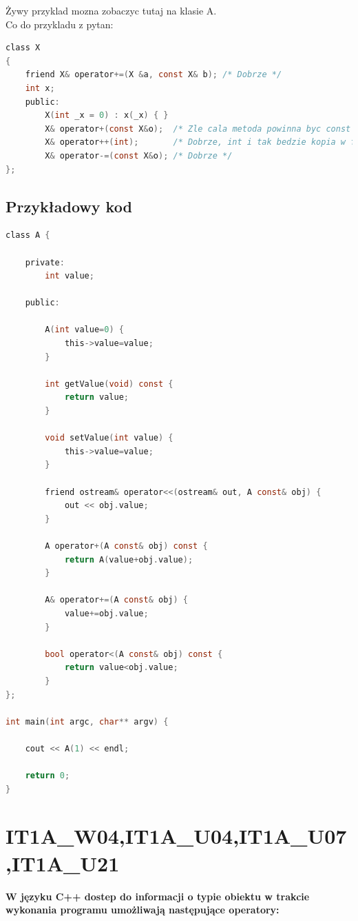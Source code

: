 Żywy przyklad mozna zobaczyc tutaj na klasie A.\\

Co do przykladu z pytan:\\
\begin{lstlisting}[language=c]
class X
{
	friend X& operator+=(X &a, const X& b); /* Dobrze */
	int x;
	public:
		X(int _x = 0) : x(_x) { }
		X& operator+(const X&o);  /* Zle cala metoda powinna byc const */
		X& operator++(int);       /* Dobrze, int i tak bedzie kopia w funkcji */
		X& operator-=(const X&o); /* Dobrze */
};
\end{lstlisting}

\subsection{Przykładowy kod}
\begin{lstlisting}[language=c]
class A {
	
	private:
		int value;
	
	public:
		
		A(int value=0) {
			this->value=value;
		}
		
		int getValue(void) const {
			return value;
		}
		
		void setValue(int value) {
			this->value=value;
		}
		
		friend ostream& operator<<(ostream& out, A const& obj) {
			out << obj.value;
		}
		
		A operator+(A const& obj) const {
			return A(value+obj.value);
		}
		
		A& operator+=(A const& obj) {
			value+=obj.value;
		}
		
		bool operator<(A const& obj) const {
			return value<obj.value;
		}
};

int main(int argc, char** argv) {
	
	cout << A(1) << endl;
	
	return 0;
}
\end{lstlisting}


\section{IT1A\_W04,IT1A\_U04,IT1A\_U07,IT1A\_U21}
\textbf{W języku C++ dostep do informacji o typie obiektu w trakcie wykonania programu umożliwają następujące operatory:}


